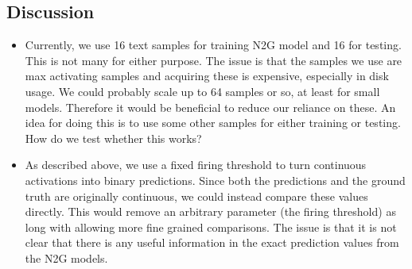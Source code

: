 \documentclass[main.tex]{subfiles}
\begin{document}
\subsection{Discussion}
\begin{itemize}
    \item Currently, we use 16 text samples for training N2G model 
    and 16 for testing.
    This is not many for either purpose.
    The issue is that the samples we use are max activating samples 
    and acquiring these is expensive, especially in disk usage.
    We could probably scale up to 64 samples or so, 
    at least for small models.
    Therefore it would be beneficial to reduce our reliance on these.
    An idea for doing this is to use some other samples for either 
    training or testing.
    How do we test whether this works?
    \item As described above, we use a fixed firing threshold 
    to turn continuous activations into binary predictions.
    Since both the predictions and the ground truth 
    are originally continuous, 
    we could instead compare these values directly.
    This would remove an arbitrary parameter (the firing threshold) 
    as long with allowing more fine grained comparisons.
    The issue is that it is not clear that there is any useful information 
    in the exact prediction values from the N2G models.
\end{itemize}


\nocite{foote_neuron_2023}
\end{document}
